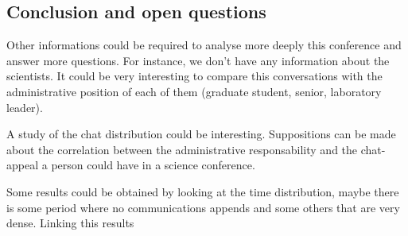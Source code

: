 \subsection{Conclusion and open questions}

Other informations could be required to analyse more deeply this conference and answer more questions. 
For instance, we don't 
have any information about the scientists. It could be very interesting to compare this conversations
with the administrative position of each of them (graduate student, senior, laboratory leader).

A study of the chat distribution could be interesting. Suppositions can be made about the correlation
between the administrative responsability and the chat-appeal a person could have in a science conference.

Some results could be obtained by looking at the time distribution, maybe there is some period where
no communications appends and some others that are very dense. Linking this results



